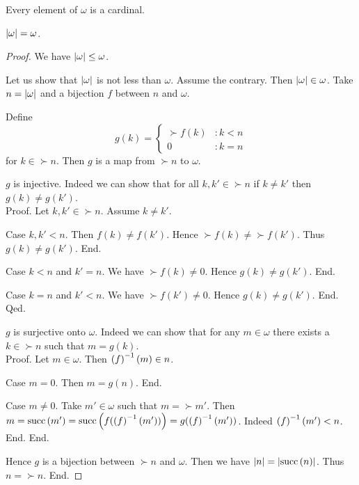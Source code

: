 \documentclass[../set-theory.tex]{subfiles}
\begin{document}
  \begin{forthel}
    \begin{corollary}
      Every element of $\omega$ is a cardinal.
    \end{corollary}
  \end{forthel}

  \begin{forthel}
    \begin{proposition}
      $\left\vert\omega\right\vert = \omega$.
    \end{proposition}
    \begin{proof}
      We have $\left\vert\omega\right\vert \leq \omega$.

      Let us show that $\left\vert\omega\right\vert$ is not less than $\omega$.
        Assume the contrary.
        Then $\left\vert\omega\right\vert \in \omega$.
        Take $n = \left\vert\omega\right\vert$ and a bijection $f$ between $n$ and $\omega$.

        Define \[ g(k) =
          \begin{cases}
            \succ{f(k)} & : k \less n
            \\
            0           & : k = n
          \end{cases} \]
        for $k \in \succ{n}$.
        Then $g$ is a map from $\succ{n}$ to $\omega$.

        $g$ is injective.
        Indeed we can show that for all $k, k' \in \succ{n}$ if $k \neq k'$
        then $g(k) \neq g(k')$. \\
        Proof.
          Let $k, k' \in \succ{n}$.
          Assume $k \neq k'$.

          Case $k, k' \less n$.
            Then $f(k) \neq f(k')$.
            Hence $\succ{f(k)} \neq \succ{f(k')}$.
            Thus $g(k) \neq g(k')$.
          End.

          Case $k \less n$ and $k' = n$.
            We have $\succ{f(k)} \neq 0$.
            Hence $g(k) \neq g(k')$.
          End.

          Case $k = n$ and $k' \less n$.
            We have $\succ{f(k')} \neq 0$.
            Hence $g(k) \neq g(k')$.
          End.
        Qed.

        $g$ is surjective onto $\omega$.
        Indeed we can show that for any $m \in \omega$ there exists a
        $k \in \succ{n}$ such that $m = g(k)$. \\
        Proof.
          Let $m \in \omega$.
          Then $\left(f\right)^{-1}(m) \in n$.

          Case $m = 0$.
            Then $m = g(n)$.
          End.

          Case $m \neq 0$.
            Take $m' \in \omega$ such that $m = \succ{m'}$.
            Then $m
              = \mathrm{succ}\left(m'\right)
              = \mathrm{succ}\left(f(\left(f\right)^{-1}(m'))\right)
              = g(\left(f\right)^{-1}(m'))$.
            Indeed $\left(f\right)^{-1}(m') < n$.
          End.
        End.

        Hence $g$ is a bijection between $\succ{n}$ and $\omega$.
        Then we have $\left\vert n\right\vert = \left\vert\mathrm{succ}\left(n\right)\right\vert$.
        Thus $n = \succ{n}$.
      End.
    \end{proof}
  \end{forthel}
\end{document}
